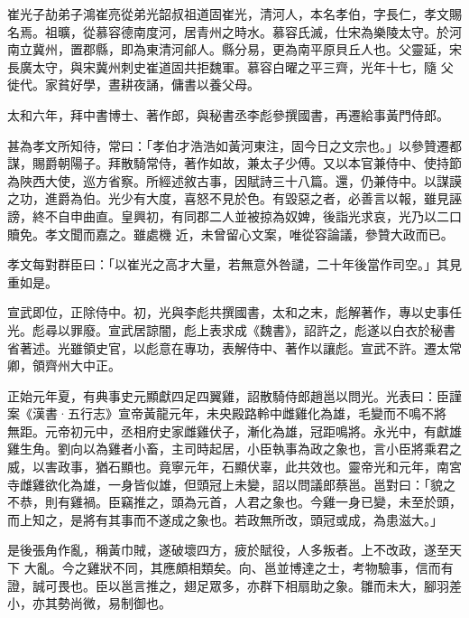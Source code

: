 
\begin{pinyinscope}

 崔光子劼弟子鴻崔亮從弟光韶叔祖道固崔光，清河人，本名孝伯，字長仁，孝文賜名焉。祖曠，從慕容德南度河，居青州之時水。慕容氏滅，仕宋為樂陵太守。於河南立冀州，置郡縣，即為東清河鄃人。縣分易，更為南平原貝丘人也。父靈延，宋長廣太守，與宋冀州刺史崔道固共拒魏軍。慕容白曜之平三齊，光年十七，隨
 父徙代。家貧好學，晝耕夜誦，傭書以養父母。



 太和六年，拜中書博士、著作郎，與秘書丞李彪參撰國書，再遷給事黃門侍郎。



 甚為孝文所知待，常曰：「孝伯才浩浩如黃河東注，固今日之文宗也。」以參贊遷都謀，賜爵朝陽子。拜散騎常侍，著作如故，兼太子少傅。又以本官兼侍中、使持節為陜西大使，巡方省察。所經述敘古事，因賦詩三十八篇。還，仍兼侍中。以謀謨之功，進爵為伯。光少有大度，喜怒不見於色。有毀惡之者，必善言以報，雖見誣謗，終不自申曲直。皇興初，有同郡二人並被掠為奴婢，後詣光求哀，光乃以二口贖免。孝文聞而嘉之。雖處機
 近，未曾留心文案，唯從容論議，參贊大政而已。



 孝文每對群臣曰：「以崔光之高才大量，若無意外咎譴，二十年後當作司空。」其見重如是。



 宣武即位，正除侍中。初，光與李彪共撰國書，太和之末，彪解著作，專以史事任光。彪尋以罪廢。宣武居諒闇，彪上表求成《魏書》，詔許之，彪遂以白衣於秘書省著述。光雖領史官，以彪意在專功，表解侍中、著作以讓彪。宣武不許。遷太常卿，領齊州大中正。



 正始元年夏，有典事史元顯獻四足四翼雞，詔散騎侍郎趙邕以問光。光表曰：臣謹案《漢書·五行志》宣帝黃龍元年，未央殿路軨中雌雞化為雄，毛變而不鳴不將
 無距。元帝初元中，丞相府史家雌雞伏子，漸化為雄，冠距鳴將。永光中，有獻雄雞生角。劉向以為雞者小畜，主司時起居，小臣執事為政之象也，言小臣將乘君之威，以害政事，猶石顯也。竟寧元年，石顯伏辜，此共效也。靈帝光和元年，南宮寺雌雞欲化為雄，一身皆似雄，但頭冠上未變，詔以問議郎蔡邕。邕對曰：「貌之不恭，則有雞禍。臣竊推之，頭為元首，人君之象也。今雞一身已變，未至於頭，而上知之，是將有其事而不遂成之象也。若政無所改，頭冠或成，為患滋大。」



 是後張角作亂，稱黃巾賊，遂破壞四方，疲於賦役，人多叛者。上不改政，遂至天下
 大亂。今之雞狀不同，其應頗相類矣。向、邕並博達之士，考物驗事，信而有證，誠可畏也。臣以邕言推之，翅足眾多，亦群下相扇助之象。雛而未大，腳羽差小，亦其勢尚微，易制御也。




\end{pinyinscope}

